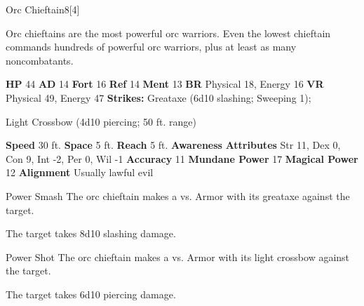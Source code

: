   \begin{monsubsection}{Orc Chieftain}{8}[4]
    \vspace{-1em}\vspace{-1em}
    \vspace{0em}

    
          Orc chieftains are the most powerful orc warriors.
          Even the lowest chieftain commands hundreds of powerful orc warriors, plus at least as many noncombatants.
        

    \begin{spellcontent}
      \begin{spelltargetinginfo}
        \pari \textbf{HP} 44 \monsep
          \textbf{AD} 14 \monsep
          \textbf{Fort} 16 \monsep
          \textbf{Ref} 14 \monsep
          \textbf{Ment} 13
        \pari \textbf{BR} Physical 18, Energy 16 \monsep
        \textbf{VR} Physical 49, Energy 47
        \pari \textbf{Strikes:}
            Greataxe  (6d10 slashing; Sweeping 1);
\par Light Crossbow  (4d10 piercing; 50 ft. range)
      \end{spelltargetinginfo}
    \end{spellcontent}
    \begin{monsterfooter}
      \pari \textbf{Speed} 30 ft. \monsep
        \textbf{Space} 5 ft. \monsep
        \textbf{Reach} 5 ft.
      \pari \textbf{Awareness} 
      \pari \textbf{Attributes}
        Str 11, Dex 0,
        Con 9, Int -2,
        Per 0, Wil -1
      \pari \textbf{Accuracy} 11 \monsep
        \textbf{Mundane Power} 17 \monsep
      \textbf{Magical Power} 12
      \pari \textbf{Alignment} Usually lawful evil
    \end{monsterfooter}
  \end{monsubsection}
  \begin{freeability}{Power Smash}
       The orc chieftain makes a 
         vs. Armor
        with its greataxe against the target.
    
    \hit The target takes 8d10 slashing damage.
    \end{freeability}
  

    \begin{freeability}{Power Shot}
       The orc chieftain makes a 
         vs. Armor
        with its light crossbow against the target.
    
    \hit The target takes 6d10 piercing damage.
    \end{freeability}
  

